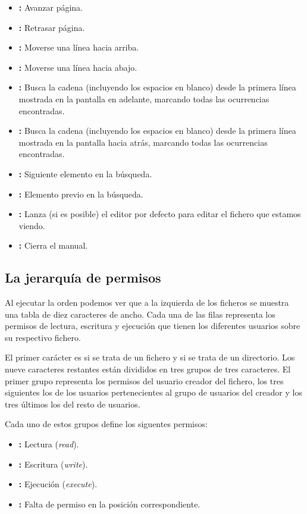 \begin{itemize}
	\item{}\textbf{:} Avanzar página.
	\item{}\textbf{:} Retrasar página.
	\item{}\textbf{:} Moverse una línea hacia arriba.
	\item{}\textbf{:} Moverse una línea hacia abajo.
	\item{}\textbf{:} Busca la cadena  (incluyendo los espacios en blanco) desde la primera línea mostrada en la pantalla en adelante, marcando todas las ocurrencias encontradas.
	\item{}\textbf{:} Busca la cadena  (incluyendo los espacios en blanco) desde la primera línea mostrada en la pantalla hacia atrás, marcando todas las ocurrencias encontradas.
	\item{}\textbf{:} Siguiente elemento en la búsqueda.
	\item{}\textbf{:} Elemento previo en la búsqueda.
	\item{}\textbf{:} Lanza (si es posible) el editor por defecto para editar el fichero que estamos viendo.
	\item{}\textbf{:} Cierra el manual.
\end{itemize}

\subsection{La jerarquía de permisos}

Al ejecutar la orden  podemos ver que a la izquierda de los ficheros se muestra una tabla de diez caracteres de ancho.
Cada una de las filas representa los permisos de lectura, escritura y ejecución que tienen los diferentes usuarios sobre su respectivo fichero.

El primer carácter es \code{-} si se trata de un fichero y  si se trata de un directorio.
Los nueve caracteres restantes están divididos en tres grupos de tres caracteres.
El primer grupo representa los permisos del usuario creador del fichero, los tres siguientes los de los usuarios pertenecientes al grupo de usuarios del creador y los tres últimos los del resto de usuarios.

Cada uno de estos grupos define los siguentes permisos:

\begin{itemize}
	\item{}\textbf{:} Lectura (\textit{read}).
	\item{}\textbf{:} Escritura (\textit{write}).
	\item{}\textbf{:} Ejecución (\textit{execute}).
	\item\code{-}\textbf{:} Falta de permiso en la posición correspondiente.
\end{itemize}

